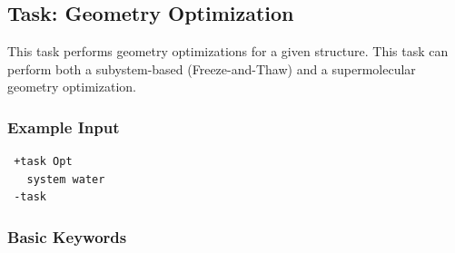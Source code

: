 \documentclass[bibliography=totocnumbered,a4paper,10pt,oneside]{scrbook}
\begin{document}
\subsection{Task: Geometry Optimization}
This task performs geometry optimizations for a given structure. This task can perform both a subystem-based (Freeze-and-Thaw) and a supermolecular geometry optimization.
\subsubsection{Example Input}
\begin{lstlisting}
 +task Opt
   system water
 -task
\end{lstlisting}
\subsubsection{Basic Keywords}
\end{document}
